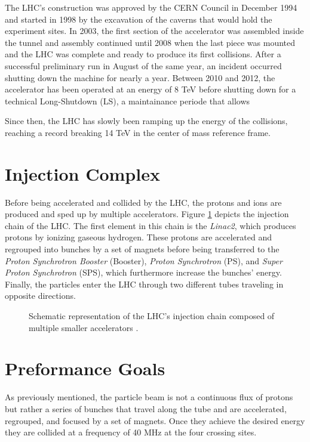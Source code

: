   The LHC's construction was approved by the CERN Council in December 1994 and started in 1998 by the excavation of the caverns that would hold the experiment sites. In 2003, the first section of the accelerator was assembled inside the tunnel and assembly continued until 2008 when the last piece was mounted and the LHC was complete and ready to produce its first collisions. After a successful preliminary run in August of the same year, an incident occurred shutting down the machine for nearly a year. Between 2010 and 2012, the accelerator has been operated at an energy of 8 TeV before shutting down for a technical Long-Shutdown (LS), a maintainance periode that allows

  Since then, the LHC has slowly been ramping up the energy of the collisions, reaching a record breaking 14 TeV in the center of mass reference frame.

  \section{Injection Complex}

		Before being accelerated and collided by the LHC, the protons and ions are produced and sped up by multiple accelerators. Figure \ref{fig:lhc_and_cms__lhc_injection_chain} depicts the injection chain of the LHC. The first element in this chain is the \emph{Linac2}, which produces protons by ionizing gaseous hydrogen. These protons are accelerated and regrouped into bunches by a set of magnets before being transferred to the \emph{Proton Synchrotron Booster} (Booster), \emph{Proton Synchrotron} (PS), and \emph{Super Proton Synchrotron} (SPS), which furthermore increase the bunches' energy. Finally, the particles enter the LHC through two different tubes traveling in opposite directions.

		\begin{figure}[h!]
			\centering
			\caption{Schematic representation of the LHC's injection chain composed of multiple smaller accelerators \Cite{Fig_LHC_Chain}.}
			\label{fig:lhc_and_cms__lhc_injection_chain}
		\end{figure}

	\section{Preformance Goals}

  	As previously mentioned, the particle beam is not a continuous flux of protons but rather a series of bunches that travel along the tube and are accelerated, regrouped, and focused by a set of magnets. Once they achieve the desired energy they are collided at a frequency of 40 MHz at the four crossing sites. \\

